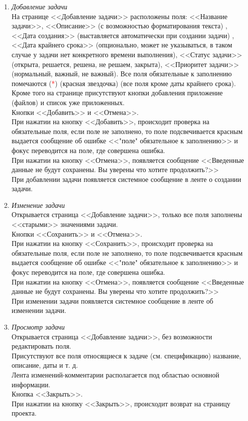 \documentclass[14pt,a4paper]{extarticle}
\begin{document}
\begin{enumerate}
\begin{enumerate}
				\item {\it Добавление задачи}\\
				На странице <<Добавление задачи>> расположены поля: <<Название задачи>>, <<Описание>> (с возможностью форматирования текста) , <<Дата создания>> (выставляется автоматически при создании задачи) , <<Дата крайнего срока>> (опционально, может не указываться, в таком случае у задачи нет конкретного времени выполнения), <<Статус задачи>> (открыта, решается, решена, не решаем, закрыта), <<Приоритет задачи>> (нормальный, важный, не важный). Все поля обязательные к заполнению помечаются (\textcolor{red}{*}) (красная звездочка) (все поля кроме даты крайнего срока).\\
				Кроме того на странице присутствуют кнопки добавления приложение (файлов) и список уже приложенных.\\ 
				Кнопки <<Добавить>> и <<Отмена>>.\\
				При нажатии на кнопку <<Добавить>>, происходит проверка на обязательные поля, если поле не заполнено, то поле подсвечивается красным выдается сообщение об ошибке <<"поле" обязательное к заполнению>> и фокус переводится на поле, где совершена ошибка.\\
				При нажатии на кнопку <<Отмена>>, появляется сообщение <<Введенные данные не будут сохранены. Вы уверены что хотите продолжить?>>\\
				При добавлении задачи появляется системное сообщение в ленте о создании задачи.

				\item {\it Изменение задачи}\\
				Открывается страница <<Добавление задачи>>, только все поля заполнены <<старыми>> значениями задачи.\\
				Кнопки <<Сохранить>> и <<Отмена>>.\\
				При нажатии на кнопку <<Сохранить>>, происходит проверка на обязательные поля, если поле не заполнено, то поле подсвечивается красным выдается сообщение об ошибке <<"поле" обязательное к заполнению>> и фокус переводится на поле, где совершена ошибка.\\
				При нажатии на кнопку <<Отмена>>, появляется сообщение <<Введенные данные не будут сохранены. Вы уверены что хотите продолжить?>>\\
				При изменении задачи появляется системное сообщение в ленте об изменении задачи.
				
				\item {\it Просмотр задачи}\\
				Открывается страница <<Добавление задачи>>, без возможности редактировать поля.\\
				Присутствуют все поля относящиеся к задаче (см. спецификацию) название, описание, даты и т. д.\\
				Лента изменений-комментарии располагается под областью основной информации.\\
				Кнопка <<Закрыть>>.\\
				При нажатии на кнопку <<Закрыть>>, происходит возврат на страницу проекта.
				

\end{enumerate}
\end{enumerate}
\end{document}
